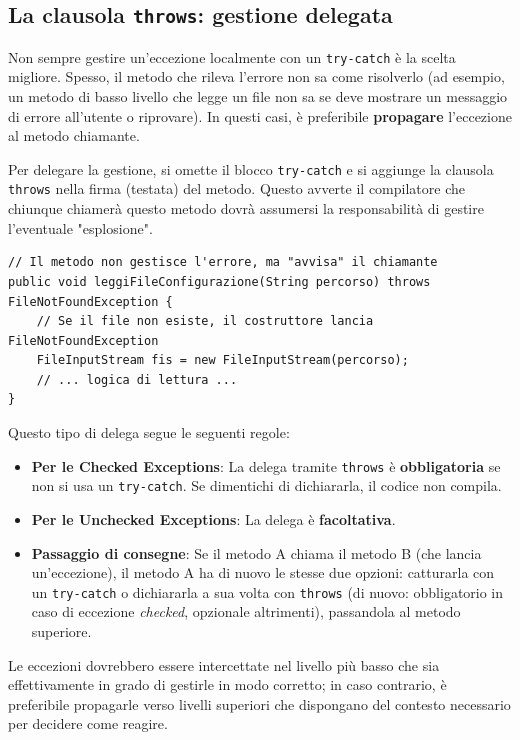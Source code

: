 \subsection{La clausola \texttt{throws}: gestione delegata}

Non sempre gestire un'eccezione localmente con un \texttt{try-catch} è la scelta migliore. Spesso, il metodo che rileva l'errore non sa come risolverlo (ad esempio, un metodo di basso livello che legge un file non sa se deve mostrare un messaggio di errore all'utente o riprovare). In questi casi, è preferibile \textbf{propagare} l'eccezione al metodo chiamante.

Per delegare la gestione, si omette il blocco \texttt{try-catch} e si aggiunge la clausola \texttt{throws} nella firma (testata) del metodo. Questo avverte il compilatore che chiunque chiamerà questo metodo dovrà assumersi la responsabilità di gestire l'eventuale "esplosione".

\begin{lstlisting}[caption={Esempio di delega dell'eccezione}]
// Il metodo non gestisce l'errore, ma "avvisa" il chiamante
public void leggiFileConfigurazione(String percorso) throws FileNotFoundException {
    // Se il file non esiste, il costruttore lancia FileNotFoundException
    FileInputStream fis = new FileInputStream(percorso); 
    // ... logica di lettura ...
}
\end{lstlisting}

Questo tipo di delega segue le seguenti regole:
\begin{itemize}
    \item \textbf{Per le Checked Exceptions}: La delega tramite \texttt{throws} è \textbf{obbligatoria} se non si usa un \texttt{try-catch}. Se dimentichi di dichiararla, il codice non compila.
    \item \textbf{Per le Unchecked Exceptions}: La delega è \textbf{facoltativa}.
    \item \textbf{Passaggio di consegne}: Se il metodo A chiama il metodo B (che lancia un'eccezione), il metodo A ha di nuovo le stesse due opzioni: catturarla con un \texttt{try-catch} o dichiararla a sua volta con \texttt{throws} (di nuovo: obbligatorio in caso di eccezione \textit{checked}, opzionale altrimenti), passandola al metodo superiore.
\end{itemize}

\begin{bestpractice}
Le eccezioni dovrebbero essere intercettate nel livello più basso che sia effettivamente in grado di gestirle in modo corretto; in caso contrario, è preferibile propagarle verso livelli superiori che dispongano del contesto necessario per decidere come reagire.
\end{bestpractice}

